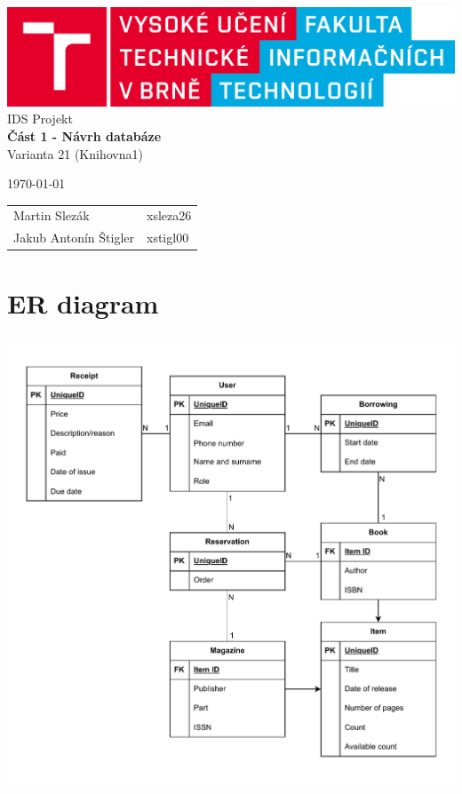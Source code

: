 \documentclass{article}
\begin{document}
\begin{titlepage}
    \begin{center}
        \includegraphics[width=1\textwidth]{assets/FIT_logo.png} \\
        \Huge{IDS Projekt} \\
        \Large{\textbf{Část 1 - Návrh databáze}} \\
        \large{Varianta 21 (Knihovna1)}
    \end{center}
    \vfill
    {
        \large \today \hfill
        \large
        \begin{tabular}{l l}
            Martin Slezák          & \quad xsleza26 \\
            Jakub Antonín Štigler  & \quad xstigl00 \\
        \end{tabular}
    }
\end{titlepage}

\section*{ER diagram}

\includegraphics*[width=1\textwidth]{assets/er.pdf}
\end{document}
